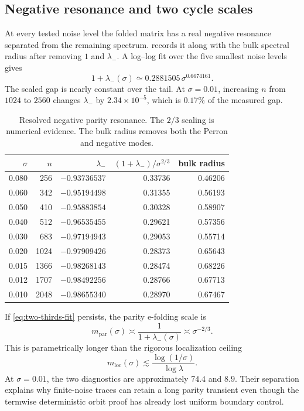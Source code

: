 \documentclass[11pt]{article}
\theoremstyle{definition}
\theoremstyle{remark}
\begin{document}
\subsection{Negative resonance and two cycle scales}

At every tested noise level the folded matrix has a real negative resonance
separated from the remaining spectrum.   records it
along with the bulk spectral radius after removing $1$ and $\lambda_-$.  A log--log
fit over the five smallest noise levels gives
\begin{equation}\label{eq:two-thirds-fit}
 1+\lambda_-(\sigma)
 \simeq0.2881505\,\sigma^{0.6674161}.
\end{equation}
The scaled gap is nearly constant over the tail.  At $\sigma=0.01$, increasing
$n$ from $1024$ to $2560$ changes $\lambda_-$ by
$2.34\times10^{-5}$, which is $0.17\%$ of the measured gap.

\begin{table}[t]
\centering
\small
\caption{Resolved negative parity resonance.  The $2/3$ scaling is numerical
evidence.  The bulk radius removes both the Perron and negative modes.}
\label{tab:parity-resonance}
\begin{tabular}{rrrrr}
\toprule
$\sigma$ & $n$ & $\lambda_-$ & $(1+\lambda_-)/\sigma^{2/3}$ & bulk radius\\
\midrule
0.080 & 256  & $-0.93736537$ & 0.33736 & 0.46206\\
0.060 & 342  & $-0.95194498$ & 0.31355 & 0.56193\\
0.050 & 410  & $-0.95883854$ & 0.30328 & 0.58907\\
0.040 & 512  & $-0.96535455$ & 0.29621 & 0.57356\\
0.030 & 683  & $-0.97194943$ & 0.29053 & 0.55714\\
0.020 & 1024 & $-0.97909426$ & 0.28373 & 0.65643\\
0.015 & 1366 & $-0.98268143$ & 0.28474 & 0.68226\\
0.012 & 1707 & $-0.98492256$ & 0.28766 & 0.67713\\
0.010 & 2048 & $-0.98655340$ & 0.28970 & 0.67467\\
\bottomrule
\end{tabular}
\end{table}

If \eqref{eq:two-thirds-fit} persists, the parity e-folding scale is
\begin{equation}\label{eq:parity-lifetime}
 m_{\mathrm{par}}(\sigma)
 \asymp\frac{1}{1+\lambda_-(\sigma)}
 \asymp\sigma^{-2/3}.
\end{equation}
This is parametrically longer than the rigorous localization ceiling
\begin{equation}\label{eq:localization-scale}
 m_{\mathrm{loc}}(\sigma)
 \lesssim\frac{\log(1/\sigma)}{\log\lambda}.
\end{equation}
At $\sigma=0.01$, the two diagnostics are approximately $74.4$ and $8.9$.
Their separation explains why finite-noise traces can retain a long parity
transient even though the termwise deterministic orbit proof has already lost
uniform boundary control.
\end{document}
